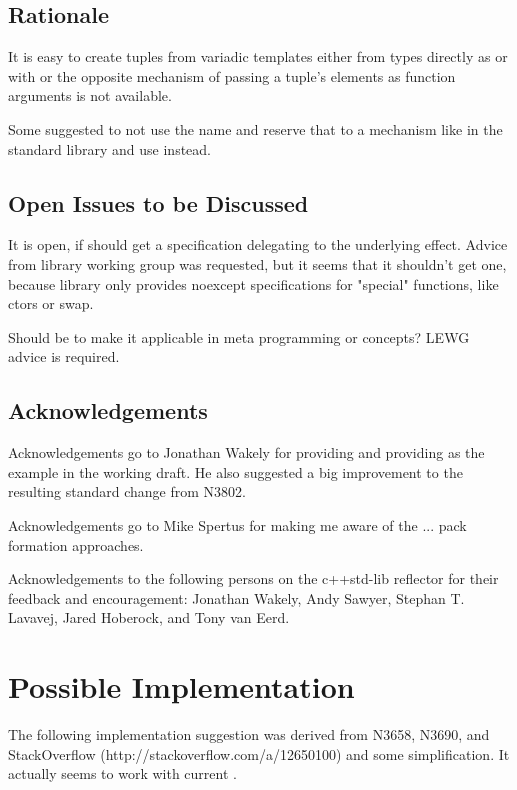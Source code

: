 \documentclass[ebook,11pt,article]{memoir}
\begin{document}
\section{Rationale}
It is easy to create tuples from variadic templates either from types directly as  or  with  or  the opposite mechanism of passing a tuple's elements as function arguments is not available.

Some suggested to not use the name and reserve that to a mechanism like \emph{} in the standard library and use  instead.

\section{Open Issues to be Discussed}
It is open, if  should get a  specification delegating to the underlying effect. Advice from library working group was requested, but it seems that it shouldn't get one, because library only provides noexcept specifications for "special" functions, like ctors or swap.

Should  be  to make it applicable in meta programming or concepts? LEWG advice is required.

\section{Acknowledgements}
Acknowledgements go to Jonathan Wakely for providing  and providing  as the example in the working draft. He also suggested a big improvement to the resulting standard change from N3802.

Acknowledgements go to Mike Spertus for making me aware of the ... pack formation approaches.

Acknowledgements to the following persons on the c++std-lib reflector for their feedback and encouragement: Jonathan Wakely, Andy Sawyer, Stephan T. Lavavej, Jared Hoberock, and Tony van Eerd.

\chapter{Possible Implementation}
The following implementation suggestion was derived from N3658, N3690, and StackOverflow (http://stackoverflow.com/a/12650100) and some simplification. It actually seems to work with current .
\end{document}
